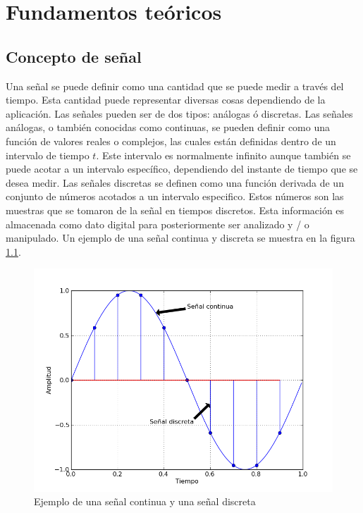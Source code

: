 \chapter{Fundamentos te\'oricos}


\section{Concepto de se\~nal}

Una se\~nal se puede definir como una cantidad que se puede medir a trav\'es del
tiempo. Esta cantidad puede representar diversas cosas dependiendo de la
aplicaci\'on. Las se\~nales pueden ser de dos tipos: an\'alogas \'o discretas.
Las se\~nales an\'alogas, o tambi\'en conocidas como continuas, se pueden
definir como una funci\'on de valores reales o complejos, las cuales est\'an
definidas dentro de un intervalo de tiempo $t$. Este intervalo es normalmente 
infinito aunque tambi\'en se puede acotar a un
intervalo espec\'ifico, dependiendo del instante de tiempo que se desea medir. 
Las se\~nales discretas se definen como una funci\'on derivada de un conjunto de 
n\'umeros acotados a un intervalo especifico. Estos n\'umeros son las muestras
que se tomaron de la se\~nal en tiempos discretos. Esta informaci\'on es
almacenada como dato digital para posteriormente ser analizado y / o manipulado.
Un ejemplo de una se\~nal continua y discreta se muestra en la figura
\ref{fig:sine}.

\begin{figure}[ht]
\centering
	\includegraphics[width=5in]{figs/sine}
	\caption{Ejemplo de una se\~nal continua y una se\~nal discreta}
	\label{fig:sine}
\end{figure}


